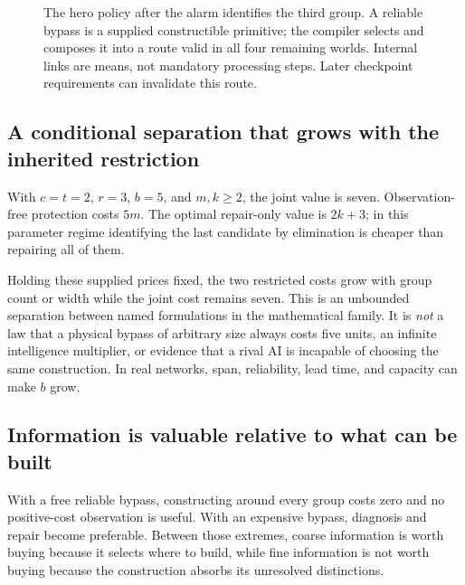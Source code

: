 \documentclass[11pt,letterpaper]{article}
\theoremstyle{remark}\newtheorem{remark}{Remark}[section]
\begin{document}
\begin{figure}[htbp]\centering
{}
\caption{The hero policy after the alarm identifies the third group. A reliable bypass is a supplied constructible primitive; the compiler selects and composes it into a route valid in all four remaining worlds. Internal links are means, not mandatory processing steps. Later checkpoint requirements can invalidate this route.}\label{fig:hero}
\end{figure}

\subsection{A conditional separation that grows with the inherited restriction}
With $c=t=2$, $r=3$, $b=5$, and $m,k\ge2$, the joint value is seven. Observation-free protection costs $5m$. The optimal repair-only value is $2k+3$; in this parameter regime identifying the last candidate by elimination is cheaper than repairing all of them.

Holding these supplied prices fixed, the two restricted costs grow with group count or width while the joint cost remains seven. This is an unbounded separation between named formulations in the mathematical family. It is \emph{not} a law that a physical bypass of arbitrary size always costs five units, an infinite intelligence multiplier, or evidence that a rival AI is incapable of choosing the same construction. In real networks, span, reliability, lead time, and capacity can make $b$ grow.

\subsection{Information is valuable relative to what can be built}
With a free reliable bypass, constructing around every group costs zero and no positive-cost observation is useful. With an expensive bypass, diagnosis and repair become preferable. Between those extremes, coarse information is worth buying because it selects where to build, while fine information is not worth buying because the construction absorbs its unresolved distinctions.
\end{document}
